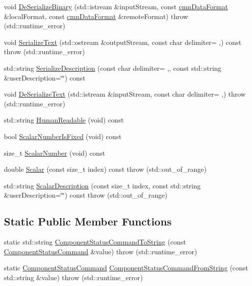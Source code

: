 \begin{DoxyCompactItemize}
\item 
void \hyperlink{classmts_component_status_control_a1f6fec491991267fcab06338df5c24ca}{De\+Serialize\+Binary} (std\+::istream \&input\+Stream, const \hyperlink{classcmn_data_format}{cmn\+Data\+Format} \&local\+Format, const \hyperlink{classcmn_data_format}{cmn\+Data\+Format} \&remote\+Format)  throw (std\+::runtime\+\_\+error)
\item 
void \hyperlink{classmts_component_status_control_a50e14690697750cdeb861c647c6df897}{Serialize\+Text} (std\+::ostream \&output\+Stream, const char delimiter= \textquotesingle{},\textquotesingle{}) const   throw (std\+::runtime\+\_\+error)
\item 
std\+::string \hyperlink{classmts_component_status_control_a97a1fa483e99f27e2f1cd22d3565ecde}{Serialize\+Description} (const char delimiter= \textquotesingle{},\textquotesingle{}, const std\+::string \&user\+Description=\char`\"{}\char`\"{}) const 
\item 
void \hyperlink{classmts_component_status_control_a8a719e3e592c8a835694636b4cb9ea55}{De\+Serialize\+Text} (std\+::istream \&input\+Stream, const char delimiter= \textquotesingle{},\textquotesingle{})  throw (std\+::runtime\+\_\+error)
\item 
std\+::string \hyperlink{classmts_component_status_control_a33a6529d08522184d0d3437cd3d7474f}{Human\+Readable} (void) const 
\item 
bool \hyperlink{classmts_component_status_control_aeec4e2676658b289026ec5c40199d63b}{Scalar\+Number\+Is\+Fixed} (void) const 
\item 
size\+\_\+t \hyperlink{classmts_component_status_control_a4ac4075e55fd2bf991ce4f0163241241}{Scalar\+Number} (void) const 
\item 
double \hyperlink{classmts_component_status_control_afd43fdd1e243148f3921f191cdd27b80}{Scalar} (const size\+\_\+t index) const   throw (std\+::out\+\_\+of\+\_\+range)
\item 
std\+::string \hyperlink{classmts_component_status_control_a1a638843ddb5fb6e02f7f68a79724116}{Scalar\+Description} (const size\+\_\+t index, const std\+::string \&user\+Description=\char`\"{}\char`\"{}) const   throw (std\+::out\+\_\+of\+\_\+range)
\end{DoxyCompactItemize}
\subsection*{Static Public Member Functions}
\begin{DoxyCompactItemize}
\item 
static std\+::string \hyperlink{classmts_component_status_control_a09297eed54a58633297fa272e91d3c76}{Component\+Status\+Command\+To\+String} (const \hyperlink{classmts_component_status_control_aaa1cc592d13ddd45a5cf695f72d3511f}{Component\+Status\+Command} \&value)  throw (std\+::runtime\+\_\+error)
\item 
static \hyperlink{classmts_component_status_control_aaa1cc592d13ddd45a5cf695f72d3511f}{Component\+Status\+Command} \hyperlink{classmts_component_status_control_ae1f43cb364e4c30acf69b456ba5d2bb2}{Component\+Status\+Command\+From\+String} (const std\+::string \&value)  throw (std\+::runtime\+\_\+error)
\end{DoxyCompactItemize}
